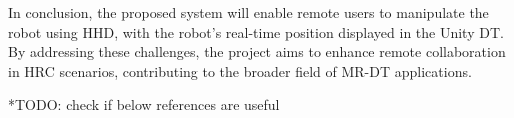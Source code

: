 In conclusion, the proposed system will enable remote users to manipulate the robot using \ac{HHD}, with the robot's real-time position displayed in the Unity \ac{DT}. By addressing these challenges, the project aims to enhance remote collaboration in \ac{HRC} scenarios, contributing to the broader field of \ac{MR}-\ac{DT} applications.

*TODO: check if below references are useful







